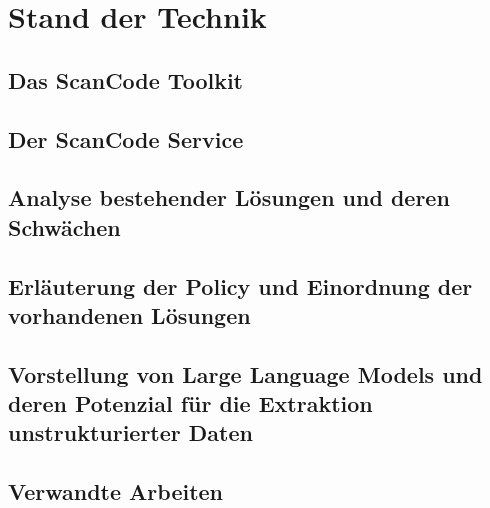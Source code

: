 \chapter{Stand der Technik}\label{ch:stand-der-technik}


\section{Das ScanCode Toolkit}\label{sec:scancode-toolkit}


\section{Der ScanCode Service}\label{sec:scancode-service}


\section{Analyse bestehender Lösungen und deren Schwächen}\label{sec:analyse-bestehender-losungen}


\section{Erläuterung der Policy und Einordnung der vorhandenen Lösungen}\label{sec:policy}


\section{Vorstellung von Large Language Models und deren Potenzial für die Extraktion unstrukturierter Daten}\label{sec:vorstellung-llm}


\section{Verwandte Arbeiten}\label{sec:verwandte-arbeiten}

